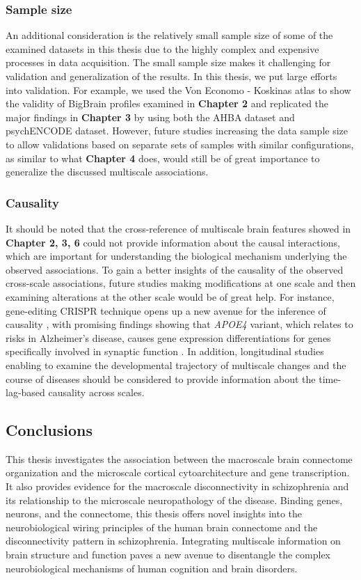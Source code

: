 \begin{refsection}
\subsubsection*{Sample size}
An additional consideration is the relatively small sample size of some of the examined datasets in this thesis due to the highly complex and expensive processes in data acquisition. The small sample size makes it challenging for validation and generalization of the results. In this thesis, we put large efforts into validation. For example, we used the Von Economo - Koskinas atlas to show the validity of BigBrain profiles examined in \textbf{Chapter 2} and replicated the major findings in \textbf{Chapter 3} by using both the AHBA dataset and psychENCODE dataset. However, future studies increasing the data sample size to allow validations based on separate sets of samples with similar configurations, as similar to what \textbf{Chapter 4} does, would still be of great importance to generalize the discussed multiscale associations.  

\subsubsection*{Causality}
It should be noted that the cross-reference of multiscale brain features showed in \textbf{Chapter 2, 3, 6} could not provide information about the causal interactions, which are important for understanding the biological mechanism underlying the observed associations. To gain a better insights of the causality of the observed cross-scale associations, future studies making modifications at one scale and then examining alterations at the other scale would be of great help. For instance, gene-editing CRISPR technique opens up a new avenue for the inference of causality \citep{Doudna2014TheNF}, with promising findings showing that \textit{APOE4} variant, which relates to risks in Alzheimer’s disease, causes gene expression differentiations for genes specifically involved in synaptic function \citep{Lin2018APOE4CW}. In addition, longitudinal studies enabling to examine the developmental trajectory of multiscale changes and the course of diseases should be considered to provide information about the time-lag-based causality across scales.

\subsection*{Conclusions}
This thesis investigates the association between the macroscale brain connectome organization and the microscale cortical cytoarchitecture and gene transcription. It also provides evidence for the macroscale disconnectivity in schizophrenia and its relationship to the microscale neuropathology of the disease. Binding genes, neurons, and the connectome, this thesis offers novel insights into the neurobiological wiring principles of the human brain connectome and the disconnectivity pattern in schizophrenia. Integrating multiscale information on brain structure and function paves a new avenue to disentangle the complex neurobiological mechanisms of human cognition and brain disorders.

\printbibliography[heading=subbibliography]

\end{refsection}